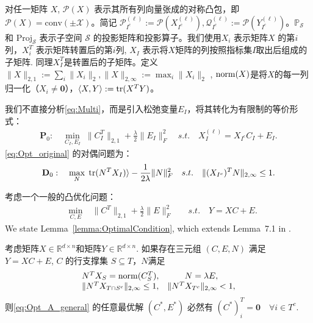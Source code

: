 \documentclass[main.tex]{subfiles}
\begin{document}
对任一矩阵 $X$, $\mathcal{P}(X)$ 表示其所有列向量张成的对称凸包，即
$\mathcal{P}(X) = \mathrm{conv}(\pm \mathcal{X})$。简记
$\mathcal{P}_{I^c}^{(\ell)} := \mathcal{P}(X_{I^c}^{(\ell)}), \mathcal{Q}_{I^c}^{(\ell)} :=
\mathcal{P}(Y_{I^c}^{(\ell)})$。$\mathbb{P}_{\mathcal{S}}$ 和
$\mathrm{Proj}_{\mathcal{S}}$ 表示子空间 $\mathcal{S}$
的投影矩阵和投影算子。我们使用$X_i$ 表示矩阵$X$ 的第$i$列，$X_i^T$ 表示矩阵转置后的第$i$列, $X_I$
表示将$X$矩阵的列按照指标集$I$取出后组成的子矩阵.
同理$X^T_I$是转置后的子矩阵。定义$\|X\|_{2, 1}:= \sum_i \|X_i\|_2,
\|X\|_{2,\infty}:=\max_i \|X_i\|_2$ ,
$\mathrm{norm}(X)$是将$X$的每一列归一化（$X_i \neq \mathbf{0}$），$\langle X, Y \rangle
:= \mathrm{tr}(X^T Y)$。

我们不直接分析\eqref{eq:Multi}，而是引入松弛变量$E_I$，将其转化为有限制的等价形式：
\begin{align}\label{eq:Opt_original}
  \mathbf{P}_0:\quad \min_{C_I, E_I} \;
  \|C_I^T\|_{2,1}+\frac{\lambda}{2}\|E_I\|_F^2 \quad
  s.t. \quad X^{(\ell)}_I=X_{I^c}C_I+E_I.
\end{align}
\eqref{eq:Opt_original} 的对偶问题为：
\begin{align}\label{eq:Opt_original_dual}
  \mathbf{D}_0:\quad \max_{N} \; \mathrm{tr}( N^T X_I) \rangle -
  \frac{1}{2\lambda}\|N\|_F^2 \quad
  s.t. \quad \|(X_{I^c})^TN\|_{2,\infty} \leq 1.
\end{align}

考虑一个一般的凸优化问题：
\begin{align}\label{eq:Opt_A_general}
  \quad \min_{C, E} \; &\|C^T\|_{2,1}+\frac{\lambda}{2}\|E\|^2_F \quad &s.t. \quad Y=XC+E.
\end{align}
We state Lemma~\ref{lemma:OptimalCondition}, which extends Lemma~7.1 in \cite{soltanolkotabi2011geometric}.
\begin{lemma}\label{lemma:OptimalCondition}
  考虑矩阵$X\in \mathbb{R}^{d\times n}$和矩阵$Y \in \mathbb{R}^{d\times n}$.
  如果存在三元组 $(C,E,N)$ 满足 $Y=XC+E$, $C$ 的行支撑集 $S\subseteq T$，$N$满足
  \begin{equation*}
    \begin{array}{cc}
      N^T X_S = \mathrm{norm}(C_S^T),  & N=\lambda E, \\
      \|N^T X_{T\cap S^{c}}\|_{2, \infty} \leq 1, & \|N^T X_{T^{c}}\|_{2, \infty}<1,
    \end{array}
  \end{equation*}
  则\eqref{eq:Opt_A_general} 的任意最优解 $(C^{*},E^{*})$ 必然有
  $(C^{*})^T_i=\mathbf{0} \quad \forall i \in T^c$.
\end{lemma}
\end{document}
